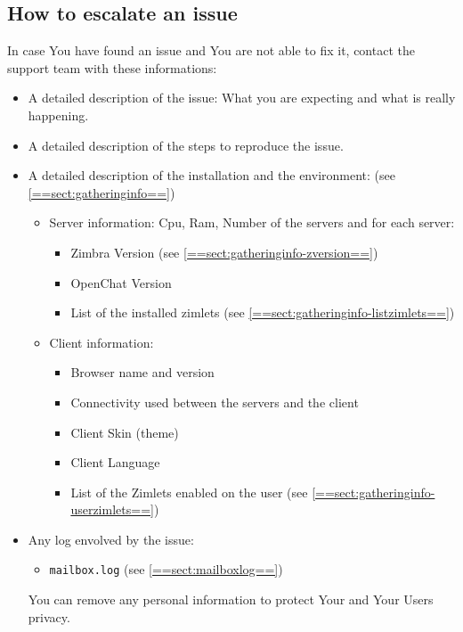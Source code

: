     \subsection[Escalate an issue]{How to escalate an issue}
    \label{==sect:how-to-escalate-an-issue==}
        In case You have found an issue and You are not able to fix it, contact the support team with these informations:
        \begin{itemize}
            \item A detailed description of the issue: What you are expecting and what is really happening.
            \item A detailed description of the steps to reproduce the issue.
            \item A detailed description of the installation and the environment: (see \ref{==sect:gatheringinfo==})
            \begin{itemize}
                \item Server information: Cpu, Ram, Number of the servers and for each server:
                \begin{itemize}
                    \item Zimbra Version (see \ref{==sect:gatheringinfo-zversion==})
                    \item OpenChat Version
                    \item List of the installed zimlets (see \ref{==sect:gatheringinfo-listzimlets==})
                \end{itemize}
                \item Client information:
                \begin{itemize}
                    \item Browser name and version
                    \item Connectivity used between the servers and the client
                    \item Client Skin (theme)
                    \item Client Language
                    \item List of the Zimlets enabled on the user (see \ref{==sect:gatheringinfo-userzimlets==})
                \end{itemize}
            \end{itemize}
            \item Any log envolved by the issue:
            \begin{itemize}
                \item \verb+mailbox.log+ (see \ref{==sect:mailboxlog==})
            \end{itemize}
            You can remove any personal information to protect Your and Your Users privacy.
        \end{itemize}
